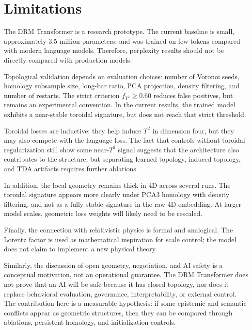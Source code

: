 \section{Limitations}
\label{sec:limitations}

The DRM Transformer is a research prototype. The current baseline is small,
approximately 3.5 million parameters, and was trained on few tokens compared
with modern language models. Therefore, perplexity results should not be
directly compared with production models.

Topological validation depends on evaluation choices: number of Voronoi seeds,
homology subsample size, long-bar ratio, PCA projection, density filtering, and
number of restarts. The strict criterion $f_{T^2}\geq 0.60$ reduces false
positives, but remains an experimental convention. In the current results, the
trained model exhibits a near-stable toroidal signature, but does not reach that
strict threshold.

Toroidal losses are inductive: they help induce $T^2$ in dimension four, but
they may also compete with the language loss. The fact that controls without
toroidal regularization still show some near-$T^2$ signal suggests that the
architecture also contributes to the structure, but separating learned
topology, induced topology, and TDA artifacts requires further ablations.

In addition, the local geometry remains thick in 4D across several runs. The
toroidal signature appears more clearly under PCA3 homology with density
filtering, and not as a fully stable signature in the raw 4D embedding. At
larger model scales, geometric loss weights will likely need to be rescaled.

Finally, the connection with relativistic physics is formal and analogical. The
Lorentz factor is used as mathematical inspiration for scale control; the model
does not claim to implement a new physical theory.

Similarly, the discussion of open geometry, negotiation, and AI safety is a
conceptual motivation, not an operational guarantee. The DRM Transformer does
not prove that an AI will be safe because it has closed topology, nor does it
replace behavioral evaluation, governance, interpretability, or external
control. The contribution here is a measurable hypothesis: if some epistemic and
semantic conflicts appear as geometric structures, then they can be compared
through ablations, persistent homology, and initialization controls.
